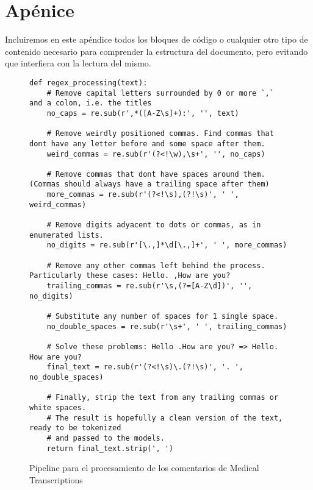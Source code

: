 \appendix
\chapter{Apénice}

Incluiremos en este apéndice todos los bloques de código o cualquier otro tipo de contenido necesario para comprender la estructura del documento, pero evitando que interfiera con la lectura del mismo.

\begin{figure}[h]
	\centering
	
	\begin{verbatim}
def regex_processing(text):
    # Remove capital letters surrounded by 0 or more `,` and a colon, i.e. the titles
    no_caps = re.sub(r',*([A-Z\s]+):', '', text)

    # Remove weirdly positioned commas. Find commas that dont have any letter before and some space after them.
    weird_commas = re.sub(r'(?<!\w),\s+', '', no_caps)
    
    # Remove commas that dont have spaces around them. (Commas should always have a trailing space after them)
    more_commas = re.sub(r'(?<!\s),(?!\s)', ' ', weird_commas)

    # Remove digits adyacent to dots or commas, as in enumerated lists.
    no_digits = re.sub(r'[\.,]*\d[\.,]+', ' ', more_commas)

    # Remove any other commas left behind the process. Particularly these cases: Hello. ,How are you?
    trailing_commas = re.sub(r'\s,(?=[A-Z\d])', '', no_digits)

    # Substitute any number of spaces for 1 single space.
    no_double_spaces = re.sub(r'\s+', ' ', trailing_commas)

    # Solve these problems: Hello .How are you? => Hello. How are you?
    final_text = re.sub(r'(?<!\s)\.(?!\s)', '. ', no_double_spaces)

    # Finally, strip the text from any trailing commas or white spaces.
    # The result is hopefully a clean version of the text, ready to be tokenized
    # and passed to the models.
    return final_text.strip(', ')
	\end{verbatim}

	\caption{Pipeline para el procesamiento de los comentarios de Medical Transcriptions}
	\label{code:pipeline-regex-mdtr}
\end{figure}